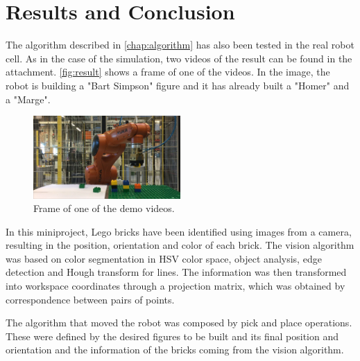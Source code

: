 \chapter{Results and Conclusion}\label{chap:results}
The algorithm described in \autoref{chap:algorithm} has also been tested in the real robot cell. As in the case of the simulation, two videos of the result can be found in the attachment. \autoref{fig:result} shows a frame of one of the videos. In the image, the robot is building a "Bart Simpson" figure and it has already built a "Homer" and a "Marge".

\begin{figure}[H]
	\includegraphics[width=0.5\textwidth]{figures/results.png}
    \caption{Frame of one of the demo videos.}
    \label{fig:result}    
\end{figure}

In this miniproject, Lego bricks have been identified using images from a camera, resulting in the position, orientation and color of each brick. The vision algorithm was based on color segmentation in HSV color space, object analysis, edge detection and Hough transform for lines. The information was then transformed into workspace coordinates through a projection matrix, which was obtained by correspondence between pairs of points.

The algorithm that moved the robot was composed by pick and place operations. These were defined by the desired figures to be built and its final position and orientation and the information of the bricks coming from the vision algorithm.